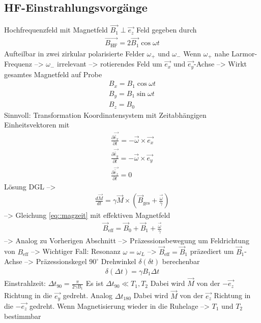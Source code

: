 \documentclass[]{scrartcl}
\begin{document}
\subsection{HF-Einstrahlungsvorgänge}
Hochfrequenzfeld mit Magnetfeld $\vec{B_1} \perp \vec{e_z}$
Feld gegeben durch
\begin{align}
\vec{B_{\text{HF}}}=2\vec{B_1} \cos \omega t
\end{align}
Aufteilbar in zwei zirkular polarisierte Felder $\omega_+$ und $\omega_-$
Wenn $\omega_+$ nahe Larmor-Frequenz --> $\omega_-$ irrelevant
--> rotierendes Feld um $\vec{e_x}$ und $\vec{e_y}$-Achse
--> Wirkt gesamtes Magnetfeld auf Probe
\begin{align*}
B_x=B_1 \cos \omega t \\
B_y=B_1 \sin \omega t \\
B_z=B_0
\end{align*}
Sinnvoll: Transformation Koordinatensystem mit Zeitabhängigen Einheitsvektoren mit
\begin{align}
\frac{\partial \vec{\tilde{e_x}}}{\partial t}= -\vec{\omega} \times \vec{e_x}\\
\frac{\partial \vec{\tilde{e_y}}}{\partial t}= -\vec{\omega} \times \vec{e_y}\\
\frac{\partial \vec{\tilde{e_z}}}{\partial t}= 0
\end{align}
Lösung DGL 
--> 
\begin{align}
\frac{d \vec{M}}{d t}= \gamma \vec{M}\times \left(\vec{B}_{\text{ges}}+\frac{\vec{\omega}}{\gamma}\right)
\end{align}
--> Gleichung \ref{eq::magzeit} mit effektiven Magnetfeld
\begin{align}
\vec{B}_\text{eff}=\vec{B}_0+\vec{B}_1+\frac{\vec{\omega}}{\gamma}
\end{align}
--> Analog zu Vorherigen Abschnitt --> Präzessionsbewegung um Feldrichtung von $B_{\text{eff}}$
--> Wichtiger Fall: Resonanz $\omega=\omega_L$ --> $\vec{B}_{\text{eff}}=\vec{B}_1$
präzediert um $\vec{B}_1$-Achse --> Präzessionskegel $90^\circ$
Drehwinkel $\delta\left(\delta t\right)$ berechenbar
\begin{align}
\delta\left(\Delta t\right)=\gamma B_1 \Delta t
\end{align}
Einstrahlzeit:
$\Delta t_{90}=\frac{\pi}{2\gamma B_1} $
Es ist $\Delta t_{90} \ll T_1,T_2$
Dabei wird $\vec{M}$ von der $-\vec{e_z}$ Richtung in die  $\vec{e_y}$ gedreht.
Analog $\Delta t_{180}$ Dabei wird $\vec{M}$ von der $\vec{e_z}$ Richtung in die  $-\vec{e_z}$ gedreht. 
Wenn Magnetisierung wieder in die Ruhelage --> $T_1$ und $T_2$ bestimmbar
\end{document}
